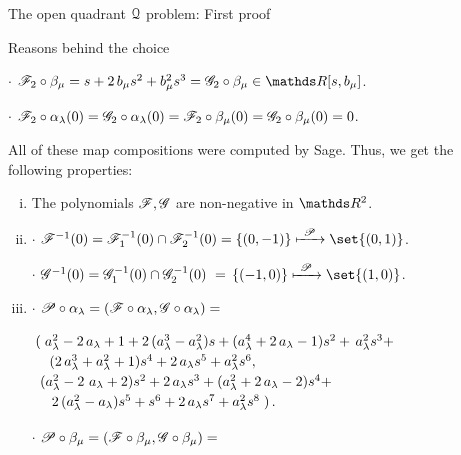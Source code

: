 \documentclass[11pt, a4paper, english, twoside, notitlepage, openright]{report}
\begin{document}
\begin{chapter}{The open quadrant $\mathcal{Q}$ problem: First proof}
\begin{section}{Reasons behind the choice}
\begin{enumerate}[(a)]
$\cdot$ $\F_2\circ\beta_{\mu}= s+2 \, b_{\mu} s^{2}+b_{\mu}^{2} s^{3} = \G_2\circ\beta_{\mu}\in\R[s,b_{\mu}]$.
				
$\cdot$ $\mathscr{F}_2\circ\alpha_{\lambda }(0)=\mathscr{G}_2\circ\alpha_{\lambda}(0)=\mathscr{F}_2\circ\beta_{\mu}(0)=\mathscr{G}_2\circ\beta_{\mu}(0)=0$.
\end{enumerate}
All of these map compositions were computed by Sage. Thus, we get the following properties:
		
\begin{enumerate}[(i)]
		
\item The polynomials $\mathscr{F},\mathscr{G}$ are non-negative in $\R^2$.
		
\item $\cdot$ $\F^{-1}(0)=\F_1^{-1}(0)\cap \F_2^{-1}(0)=\{(0,-1)\}\xmapsto{\ \P\ }\set{(0,1)}$.
			
$\cdot$ $\G^{-1}(0)=\G_1^{-1}(0)\cap \G_2^{-1}(0)\ =\, \{(-1,0)\} \xmapsto{\ \P\ } \set{(1,0)}$.
		
\item $\cdot$ $\mathscr{P}\circ\alpha_{\lambda}=(\mathscr{F}\circ\alpha_{\lambda },\mathscr{G}\circ\alpha_{\lambda})=$
			
$\arraycolsep=2pt\def\arraystretch{1.2}
\begin{array}{l}
\left(\right.a_{\lambda}^{2}-2 \,a_{\lambda}+1+2 \,{(a_{\lambda}^{3}-a_{\lambda}^{2})}s+{(a_{\lambda}^{4}+2 \, a_{\lambda}-1)} s^{2}+ \,a_{\lambda}^{2} s^{3}+\\
\quad {(2\, a_{\lambda}^{3}+a_{\lambda}^{2}+1)}s^{4}+2 \,a_{\lambda} s^{5}+a_{\lambda}^{2} s^{6},\\		
\ {(a_{\lambda}^{2}-2 \ a_{\lambda}+2)} s^{2}+2 \, a_{\lambda} s^{3}+{(a_{\lambda}^{2}+2 \,a_{\lambda}-2)}s^{4}+\\
\quad \,2 \,{(a_{\lambda}^{2}-a_{\lambda})}s^{5}+s^{6}+2\,a_{\lambda} s^{7}+a_{\lambda}^{2}s^{8}\left.\right).
\end{array}
$
				
$\cdot$ $\mathscr{P}\circ\beta_{\mu}=(\mathscr{F}\circ\beta_{\mu},\mathscr{G}\circ\beta_{\mu})=
$
				

\end{enumerate}
\end{section}
\end{chapter}
\end{document}

